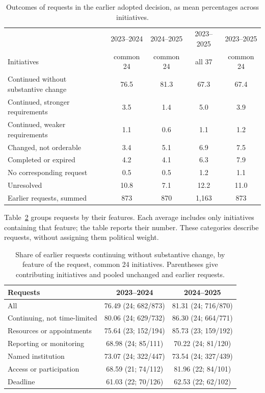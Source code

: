 \documentclass[10pt,authoryear]{elsarticle}
\begin{document}
\begin{table}[ht]
\centering\small
\caption{Outcomes of requests in the earlier adopted decision, as mean percentages across initiatives.}
\label{tab:adopted_outcomes}
\begin{tabular}{lcccc}
\toprule
 & 2023--2024 & 2024--2025 & 2023--2025 & 2023--2025 \\
Initiatives & common 24 & common 24 & all 37 & common 24 \\
\midrule
Continued without substantive change & 76.5 & 81.3 & 67.3 & 67.4 \\
Continued, stronger requirements & 3.5 & 1.4 & 5.0 & 3.9 \\
Continued, weaker requirements & 1.1 & 0.6 & 1.1 & 1.2 \\
Changed, not orderable & 3.4 & 5.1 & 6.9 & 7.5 \\
Completed or expired & 4.2 & 4.1 & 6.3 & 7.9 \\
No corresponding request & 0.5 & 0.5 & 1.2 & 1.1 \\
Unresolved & 10.8 & 7.1 & 12.2 & 11.0 \\
\addlinespace
Earlier requests, summed & 873 & 870 & 1,163 & 873 \\
\bottomrule
\end{tabular}
\end{table}

Table~\ref{tab:adopted_subsets} groups requests by their features. Each average includes only initiatives containing that feature; the table reports their number. These categories describe requests, without assigning them political weight.

\begin{table}[ht]
\centering\small
\caption{Share of earlier requests continuing without substantive change, by feature of the request, common 24 initiatives. Parentheses give contributing initiatives and pooled unchanged and earlier requests.}
\label{tab:adopted_subsets}
\begin{tabular}{lcc}
\toprule
Requests & 2023--2024 & 2024--2025 \\
\midrule
All & 76.49 (24; 682/873) & 81.31 (24; 716/870) \\
Continuing, not time-limited & 80.06 (24; 629/732) & 86.30 (24; 664/771) \\
Resources or appointments & 75.64 (23; 152/194) & 85.73 (23; 159/192) \\
Reporting or monitoring & 68.98 (24; 85/111) & 70.22 (24; 81/120) \\
Named institution & 73.07 (24; 322/447) & 73.54 (24; 327/439) \\
Access or participation & 68.59 (21; 74/112) & 81.96 (22; 84/101) \\
Deadline & 61.03 (22; 70/126) & 62.53 (22; 62/102) \\
\bottomrule
\end{tabular}
\end{table}
\end{document}
